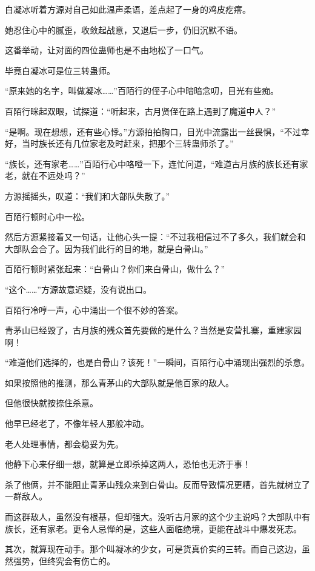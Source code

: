 \begin{this_body}
白凝冰听着方源对自己如此温声柔语，差点起了一身的鸡皮疙瘩。

她忍住心中的腻歪，收敛起战意，又退后一步，仍旧沉默不语。

这番举动，让对面的四位蛊师也是不由地松了一口气。

毕竟白凝冰可是位三转蛊师。

“原来她的名字，叫做凝冰……”百陌行的侄子心中暗暗念叨，目光有些痴。

百陌行眯起双眼，试探道：“听起来，古月贤侄在路上遇到了魔道中人？”

“是啊。现在想想，还有些心悸。”方源拍拍胸口，目光中流露出一丝畏惧，“不过幸好，当时族长还有几位家老及时赶来，把那个三转蛊师杀了。”

“族长，还有家老……”百陌行心中咯噔一下，连忙问道，“难道古月族的族长还有家老，就在不远处吗？”

方源摇摇头，叹道：“我们和大部队失散了。”

百陌行顿时心中一松。

然后方源紧接着又一句话，让他心头一提：“不过我相信过不了多久，我们就会和大部队会合了。因为我们此行的目的地，就是白骨山。”

百陌行顿时紧张起来：“白骨山？你们来白骨山，做什么？”

“这个……”方源故意迟疑，没有说出口。

百陌行冷哼一声，心中涌出一个很不妙的答案。

青茅山已经毁了，古月族的残众首先要做的是什么？当然是安营扎寨，重建家园啊！

“难道他们选择的，也是白骨山？该死！”一瞬间，百陌行心中涌现出强烈的杀意。

如果按照他的推测，那么青茅山的大部队就是他百家的敌人。

但他很快就按捺住杀意。

他早已经老了，不像年轻人那般冲动。

老人处理事情，都会稳妥为先。

他静下心来仔细一想，就算是立即杀掉这两人，恐怕也无济于事！

杀了他俩，并不能阻止青茅山残众来到白骨山。反而导致情况更糟，首先就树立了一群敌人。

而这群敌人，虽然没有根基，但却强大。没听古月家的这个少主说吗？大部队中有族长，还有家老。更令人忌惮的是，这些人面临绝境，更能在战斗中爆发死志。

其次，就算现在动手。那个叫凝冰的少女，可是货真价实的三转。而自己这边，虽然强势，但终究会有伤亡的。


\end{this_body}
